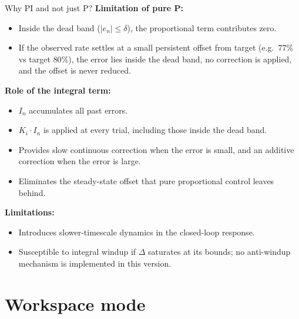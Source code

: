 \documentclass[10pt,aspectratio=169]{beamer}
\newcommand{\err}{e_n}
\newcommand{\Ki}{K_i}
\newcommand{\Iaccum}{I_n}
\newcommand{\dband}{\delta}
\begin{document}
\begin{frame}{Why PI and not just P?}
\textbf{Limitation of pure P:}
\begin{itemize}
    \item Inside the dead band ($|\err| \le \dband$), the proportional term contributes zero.
    \item If the observed rate settles at a small persistent offset from target (e.g.\ $77\%$ vs target $80\%$), the error lies inside the dead band, no correction is applied, and the offset is never reduced.
\end{itemize}

\textbf{Role of the integral term:}
\begin{itemize}
    \item $\Iaccum$ accumulates all past errors.
    \item $\Ki \cdot \Iaccum$ is applied at every trial, including those inside the dead band.
    \item Provides slow continuous correction when the error is small, and an additive correction when the error is large.
    \item Eliminates the steady-state offset that pure proportional control leaves behind.
\end{itemize}

\textbf{Limitations:}
\begin{itemize}
    \item Introduces slower-timescale dynamics in the closed-loop response.
    \item Susceptible to integral windup if $\Delta$ saturates at its bounds; no anti-windup mechanism is implemented in this version.
\end{itemize}
\end{frame}

\section{Workspace mode}
\end{document}
